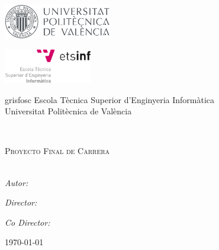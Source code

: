 
\begin{titlepage}
\begin{center}

\begin{minipage}{0.49\linewidth}
\begin{flushleft}
\includegraphics[height=1.5cm]{./imgs/logos/logo-upv}
\end{flushleft}
\end{minipage}
\begin{minipage}{0.49\linewidth}
\begin{flushright}
\includegraphics[height=1.5cm]{./imgs/logos/logo-etsinf}
\end{flushright}
\end{minipage}

\vspace{2cm}

\begin{color}{grisfosc}
\large
Escola Tècnica Superior d'Enginyeria Informàtica\\[0.2cm]
Universitat Politècnica de València\\[1.9cm]
\end{color}

\begin{spacing}{1.7}
{\Large \bfseries \titulo}\\[1.5cm]
\end{spacing}
\textsc{\large Proyecto Final de Carrera}\\[0.4cm]
\textcolor{grisclar}{\large\titulacion}\\[5.0cm]

\begin{flushright} \large
\emph{Autor:} \autor\par
\emph{Director:} \director\par
\emph{Co Director:} \codirector\par
\today
\end{flushright}


\end{center}

\end{titlepage}
